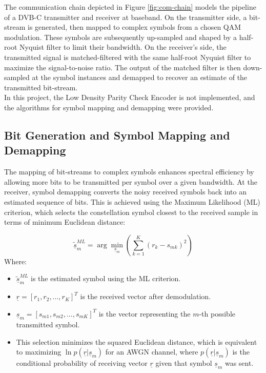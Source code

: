 The communication chain depicted in Figure \ref{fig:com-chain} models the pipeline of a DVB-C transmitter and receiver at baseband. On the transmitter side, a bit-stream is generated, then mapped to complex symbols from a chosen QAM modulation. These symbols are subsequently up-sampled and shaped by a half-root Nyquist filter to limit their bandwidth. On the receiver's side, the transmitted signal is matched-filtered with the same half-root Nyquist filter to maximize the signal-to-noise ratio. The output of the matched filter is then down-sampled at the symbol instances and demapped to recover an estimate of the transmitted bit-stream.\\
In this project, the Low Density Parity Check Encoder is not implemented, and the algorithms for symbol mapping and demapping were provided.

\subsection{Bit Generation and Symbol Mapping and Demapping}
The mapping of bit-streams to complex symbols enhances spectral efficiency by allowing more bits to be transmitted per symbol over a given bandwidth. At the receiver, symbol demapping converts the noisy received symbols back into an estimated sequence of bits. This is achieved using the Maximum Likelihood (ML) criterion, which selects the constellation symbol closest to the received sample in terms of minimum Euclidean distance:

\begin{equation}
	\tilde{\underline{s}}_{m}^{ML} = \arg\min_{\underline{s}_{m}} \left(\sum_{k=1}^{K}(r_{k}-s_{mk})^{2}\right)
\end{equation}
Where:
\begin{itemize}
	\item $\tilde{\underline{s}}_{m}^{ML}$ is the estimated symbol using the ML criterion.
	\item $\underline{r} = [r_1, r_2, \dots, r_K]^T$ is the received vector after demodulation.
	\item $\underline{s}_{m} = [s_{m1}, s_{m2}, \dots, s_{mK}]^T$ is the vector representing the $m$-th possible transmitted symbol.
	\item This selection minimizes the squared Euclidean distance, which is equivalent to maximizing $\ln p(\underline{r}|\underline{s}_{m})$ for an AWGN channel, where $p(\underline{r}|\underline{s}_{m})$ is the conditional probability of receiving vector $\underline{r}$ given that symbol $\underline{s}_m$ was sent.
\end{itemize}

